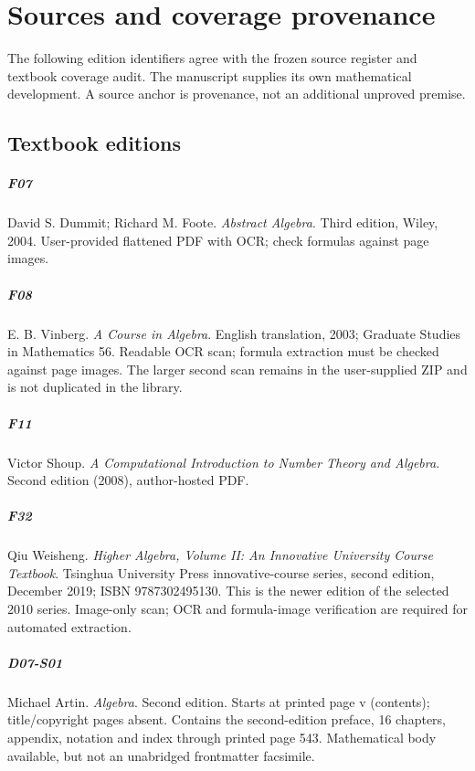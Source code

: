 \chapter{Sources and coverage provenance}
\label{app:sources}
The following edition identifiers agree with the frozen source register and textbook coverage audit.
The manuscript supplies its own mathematical development. A source anchor is provenance, not an additional unproved premise.
\section{Textbook editions}
\paragraph{F07}
David S. Dummit; Richard M. Foote. \emph{Abstract Algebra}. Third edition, Wiley, 2004. User-provided flattened PDF with OCR; check formulas against page images.
\paragraph{F08}
E. B. Vinberg. \emph{A Course in Algebra}. English translation, 2003; Graduate Studies in Mathematics 56. Readable OCR scan; formula extraction must be checked against page images. The larger second scan remains in the user-supplied ZIP and is not duplicated in the library.
\paragraph{F11}
Victor Shoup. \emph{A Computational Introduction to Number Theory and Algebra}. Second edition (2008), author-hosted PDF.
\paragraph{F32}
Qiu Weisheng. \emph{Higher Algebra, Volume II: An Innovative University Course Textbook}. Tsinghua University Press innovative-course series, second edition, December 2019; ISBN 9787302495130. This is the newer edition of the selected 2010 series. Image-only scan; OCR and formula-image verification are required for automated extraction.
\paragraph{D07-S01}
Michael Artin. \emph{Algebra}. Second edition. Starts at printed page v (contents); title/copyright pages absent. Contains the second-edition preface, 16 chapters, appendix, notation and index through printed page 543. Mathematical body available, but not an unabridged frontmatter facsimile.
